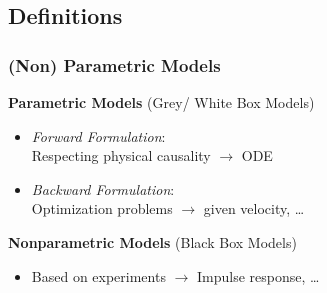 \subsection{Definitions}
    \subsubsection{(Non) Parametric Models}
        \textbf{Parametric Models} (Grey/ White Box Models)
        \begin{itemize}
            \item \textit{Forward Formulation}:\\
                Respecting physical causality $\rightarrow$  ODE
            \item \textit{Backward Formulation}:\\
                Optimization problems $\rightarrow$ given velocity, \dots
        \end{itemize}
        \textbf{Nonparametric Models} (Black Box Models)
        \begin{itemize}
            \item Based on experiments $\rightarrow$ Impulse response, \dots
        \end{itemize}

